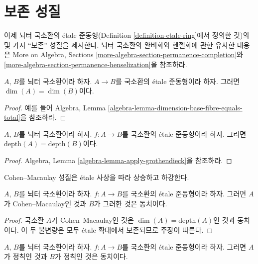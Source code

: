 \section{보존 성질}
\label{section-properties-permanence}

\noindent
이제 뇌터 국소환의 \'etale 준동형(Definition
\ref{definition-etale-ring}에서 정의한 것)의 몇 가지 “보존” 성질을 제시한다.
뇌터 국소환의 완비화와 헨젤화에 관한 유사한 내용은
More on Algebra, Sections \ref{more-algebra-section-permanence-completion}와
\ref{more-algebra-section-permanence-henselization}을 참조하라.

\begin{lemma}
\label{lemma-etale-dimension}
$A$, $B$를 뇌터 국소환이라 하자.
$A \to B$를 국소환의 \'etale 준동형이라 하자.
그러면 $\dim(A) = \dim(B)$이다.
\end{lemma}

\begin{proof}
예를 들어 Algebra, Lemma
\ref{algebra-lemma-dimension-base-fibre-equals-total}을 참조하라.
\end{proof}

\begin{proposition}
\label{proposition-etale-depth}
$A$, $B$를 뇌터 국소환이라 하자.
$f : A \to B$를 국소환의 \'etale 준동형이라 하자.
그러면 $\text{depth}(A) = \text{depth}(B)$이다.
\end{proposition}

\begin{proof}
Algebra, Lemma \ref{algebra-lemma-apply-grothendieck}을 참조하라.
\end{proof}

\begin{proposition}
\label{proposition-etale-CM}
\begin{slogan}
Cohen--Macaulay 성질은 \'etale 사상을 따라 상승하고 하강한다.
\end{slogan}
$A$, $B$를 뇌터 국소환이라 하자.
$f : A \to B$를 국소환의 \'etale 준동형이라 하자.
그러면 $A$가 Cohen--Macaulay인 것과 $B$가 그러한 것은 동치이다.
\end{proposition}

\begin{proof}
국소환 $A$가 Cohen--Macaulay인 것은
$\dim(A) = \text{depth}(A)$인 것과 동치이다.
이 두 불변량은 모두 \'etale 확대에서 보존되므로 주장이 따른다.
\end{proof}

\begin{proposition}
\label{proposition-etale-regular}
$A$, $B$를 뇌터 국소환이라 하자.
$f : A \to B$를 국소환의 \'etale 준동형이라 하자.
그러면 $A$가 정칙인 것과 $B$가 정칙인 것은 동치이다.
\end{proposition}


